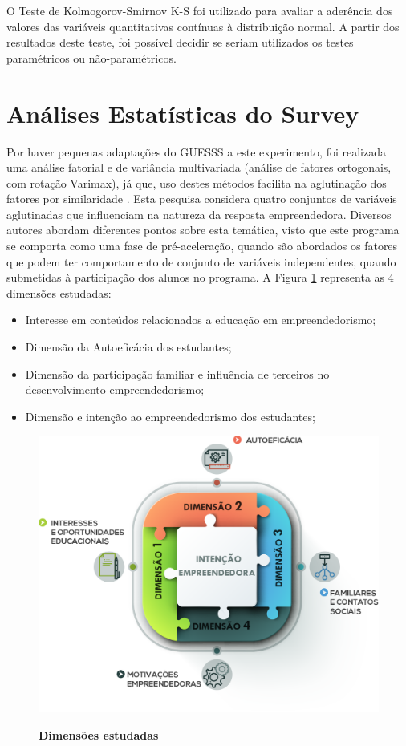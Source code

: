 O Teste de Kolmogorov-Smirnov K-S foi utilizado para avaliar a aderência dos valores das variáveis quantitativas contínuas à distribuição normal. A partir dos resultados deste teste, foi possível decidir se seriam utilizados os testes paramétricos ou não-paramétricos.

\section{Análises Estatísticas do Survey}


Por haver pequenas adaptações do GUESSS a este experimento, foi realizada uma análise fatorial e de variância multivariada (análise de fatores ortogonais, com rotação Varimax), já que, uso destes métodos facilita na aglutinação dos fatores por similaridade \cite{hair_multivariate_2006}. Esta pesquisa considera quatro conjuntos de variáveis aglutinadas que influenciam na natureza da resposta empreendedora. Diversos autores abordam diferentes pontos sobre esta temática, visto que este programa se comporta como uma fase de pré-aceleração, quando são abordados os fatores que podem ter comportamento de conjunto de variáveis independentes, quando submetidas à participação dos alunos no programa. A Figura \ref{figura_9} representa as 4 dimensões estudadas:


\begin{itemize}
\item {Interesse em conteúdos relacionados a educação em empreendedorismo;}
\item {Dimensão da Autoeficácia dos estudantes;}
\item {Dimensão da participação familiar e influência de terceiros no desenvolvimento empreendedorismo;}
\item {Dimensão e intenção  ao empreendedorismo dos estudantes;}
\end{itemize}



\begin{figure}[H]
\centering
\caption{\textbf{Dimensões estudadas}}
\includegraphics[scale=0.35]{Imagens/dimencoes.png}
\label{figura_9}
\end{figure}




